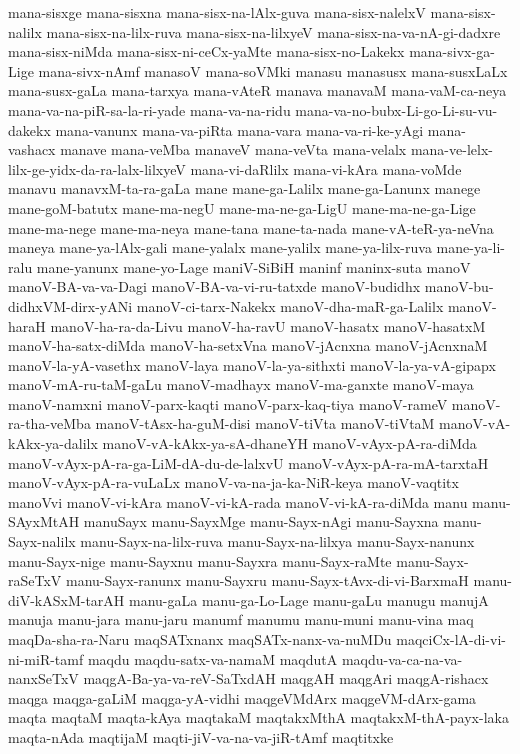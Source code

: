 {mana-sisxge
mana-sisxna
mana-sisx-na-lAlx-guva
mana-sisx-nalelxV
mana-sisx-nalilx
mana-sisx-na-lilx-ruva
mana-sisx-na-lilxyeV
mana-sisx-na-va-nA-gi-dadxre
mana-sisx-niMda
mana-sisx-ni-ceCx-yaMte
mana-sisx-no-Lakekx
mana-sivx-ga-Lige
mana-sivx-nAmf
manasoV
mana-soVMki
manasu
manasusx
mana-susxLaLx
mana-susx-gaLa
mana-tarxya
mana-vAteR
manava
manavaM
mana-vaM-ca-neya
mana-va-na-piR-sa-la-ri-yade
mana-va-na-ridu
mana-va-no-bubx-Li-go-Li-su-vu-dakekx
mana-vanunx
mana-va-piRta
mana-vara
mana-va-ri-ke-yAgi
mana-vashacx
manave
mana-veMba
manaveV
mana-veVta
mana-velalx
mana-ve-lelx-lilx-ge-yidx-da-ra-lalx-lilxyeV
mana-vi-daRlilx
mana-vi-kAra
mana-voMde
manavu
manavxM-ta-ra-gaLa
mane
mane-ga-Lalilx
mane-ga-Lanunx
manege
mane-goM-batutx
mane-ma-negU
mane-ma-ne-ga-LigU
mane-ma-ne-ga-Lige
mane-ma-nege
mane-ma-neya
mane-tana
mane-ta-nada
mane-vA-teR-ya-neVna
maneya
mane-ya-lAlx-gali
mane-yalalx
mane-yalilx
mane-ya-lilx-ruva
mane-ya-li-ralu
mane-yanunx
mane-yo-Lage
maniV-SiBiH
maninf
maninx-suta
manoV
manoV-BA-va-va-Dagi
manoV-BA-va-vi-ru-tatxde
manoV-budidhx
manoV-bu-didhxVM-dirx-yANi
manoV-ci-tarx-Nakekx
manoV-dha-maR-ga-Lalilx
manoV-haraH
manoV-ha-ra-da-Livu
manoV-ha-ravU
manoV-hasatx
manoV-hasatxM
manoV-ha-satx-diMda
manoV-ha-setxVna
manoV-jAcnxna
manoV-jAcnxnaM
manoV-la-yA-vasethx
manoV-laya
manoV-la-ya-sithxti
manoV-la-ya-vA-gipapx
manoV-mA-ru-taM-gaLu
manoV-madhayx
manoV-ma-ganxte
manoV-maya
manoV-namxni
manoV-parx-kaqti
manoV-parx-kaq-tiya
manoV-rameV
manoV-ra-tha-veMba
manoV-tAsx-ha-guM-disi
manoV-tiVta
manoV-tiVtaM
manoV-vA-kAkx-ya-dalilx
manoV-vA-kAkx-ya-sA-dhaneYH
manoV-vAyx-pA-ra-diMda
manoV-vAyx-pA-ra-ga-LiM-dA-du-de-lalxvU
manoV-vAyx-pA-ra-mA-tarxtaH
manoV-vAyx-pA-ra-vuLaLx
manoV-va-na-ja-ka-NiR-keya
manoV-vaqtitx
manoVvi
manoV-vi-kAra
manoV-vi-kA-rada
manoV-vi-kA-ra-diMda
manu
manu-SAyxMtAH
manuSayx
manu-SayxMge
manu-Sayx-nAgi
manu-Sayxna
manu-Sayx-nalilx
manu-Sayx-na-lilx-ruva
manu-Sayx-na-lilxya
manu-Sayx-nanunx
manu-Sayx-nige
manu-Sayxnu
manu-Sayxra
manu-Sayx-raMte
manu-Sayx-raSeTxV
manu-Sayx-ranunx
manu-Sayxru
manu-Sayx-tAvx-di-vi-BarxmaH
manu-diV-kASxM-tarAH
manu-gaLa
manu-ga-Lo-Lage
manu-gaLu
manugu
manujA
manuja
manu-jara
manu-jaru
manumf
manumu
manu-muni
manu-vina
maq
maqDa-sha-ra-Naru
maqSATxnanx
maqSATx-nanx-va-nuMDu
maqciCx-lA-di-vi-ni-miR-tamf
maqdu
maqdu-satx-va-namaM
maqdutA
maqdu-va-ca-na-va-nanxSeTxV
maqgA-Ba-ya-va-reV-SaTxdAH
maqgAH
maqgAri
maqgA-rishacx
maqga
maqga-gaLiM
maqga-yA-vidhi
maqgeVMdArx
maqgeVM-dArx-gama
maqta
maqtaM
maqta-kAya
maqtakaM
maqtakxMthA
maqtakxM-thA-payx-laka
maqta-nAda
maqtijaM
maqti-jiV-va-na-va-jiR-tAmf
maqtitxke
}
